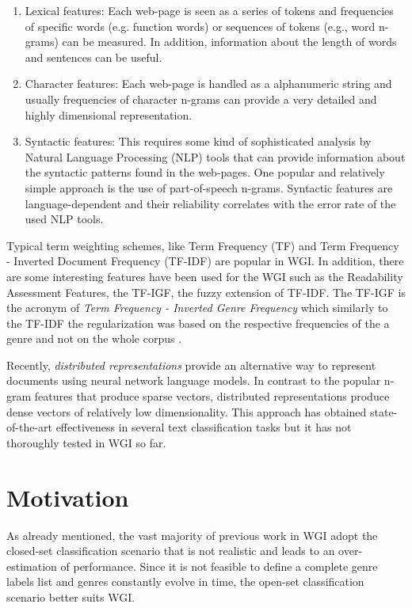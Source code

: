 \begin{itemize}
\begin{enumerate}
\item Lexical features: Each web-page is seen as a series of tokens and frequencies of specific words (e.g. function words) or sequences of tokens (e.g., word n-grams) can be measured. In addition, information about the length of words and sentences can be useful.
\item Character features: Each web-page is handled as a alphanumeric string and usually frequencies of character n-grams can provide a very detailed and highly dimensional representation. 
\item Syntactic features: This requires some kind of sophisticated analysis by Natural Language Processing (NLP) tools that can provide information about the syntactic patterns found in the web-pages. One popular and relatively simple approach is the use of part-of-speech n-grams. Syntactic features are language-dependent and their reliability correlates with the error rate of the used NLP tools.
\end{enumerate}

Typical term weighting schemes, like Term Frequency (TF) and Term Frequency - Inverted Document Frequency (TF-IDF) are popular in WGI. In addition, there are some interesting features have been used for the WGI such as the Readability Assessment Features, the TF-IGF, the fuzzy extension of TF-IDF. The TF-IGF is the acronym of \textit{Term Frequency - Inverted Genre Frequency} which similarly to the TF-IDF the regularization was based on the respective frequencies of the a genre and not on the whole corpus \parencite{sugiyanto2014term,}.

Recently, \textit{distributed representations} provide an alternative way to represent documents using neural network language models. In contrast to the popular n-gram features that produce sparse vectors, distributed representations produce dense vectors of relatively low dimensionality. This approach has obtained state-of-the-art effectiveness in several text classification tasks but it has not thoroughly tested in WGI so far. 

\section{Motivation} 
\label{chap:introduction:sec:motivation_objective}

As already mentioned, the vast majority of previous work in WGI adopt the closed-set classification scenario that is not realistic and leads to an over-estimation of performance. Since it is not feasible to define a complete genre labels list and genres constantly evolve in time, the open-set classification scenario better suits WGI. 


\end{itemize}
